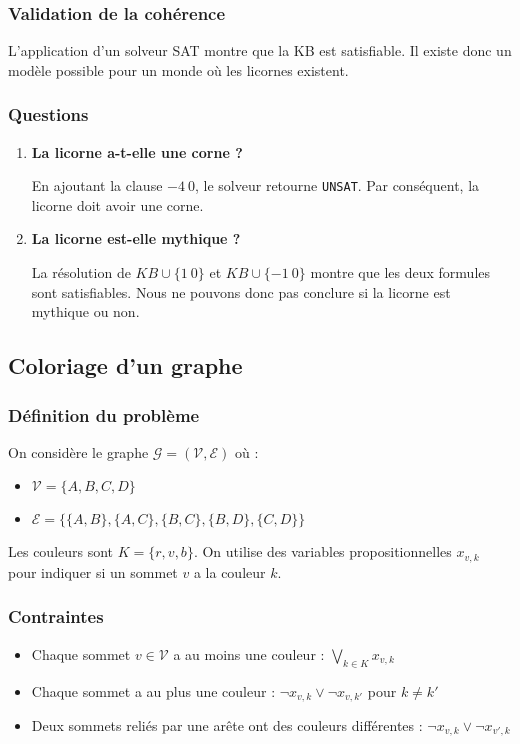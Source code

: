 \documentclass[a4paper,12pt]{article}
\begin{document}
\subsubsection{Validation de la cohérence}
L'application d'un solveur SAT montre que la KB est satisfiable. Il existe donc un modèle possible pour un monde où les licornes existent.

\subsubsection{Questions}
\begin{enumerate}
    \item \textbf{La licorne a-t-elle une corne ?}

    En ajoutant la clause $-4 \ 0$, le solveur retourne \texttt{UNSAT}. Par conséquent, la licorne doit avoir une corne.

    \item \textbf{La licorne est-elle mythique ?}

    La résolution de $KB \cup \{1 \ 0\}$ et $KB \cup \{-1 \ 0\}$ montre que les deux formules sont satisfiables. Nous ne pouvons donc pas conclure si la licorne est mythique ou non.
\end{enumerate}

\subsection{Coloriage d'un graphe}

\subsubsection{Définition du problème}
On considère le graphe $\mathcal{G} = (\mathcal{V}, \mathcal{E})$ où :
\begin{itemize}
    \item $\mathcal{V} = \{A, B, C, D\}$
    \item $\mathcal{E} = \{ \{A, B\}, \{A, C\}, \{B, C\}, \{B, D\}, \{C, D\} \}$
\end{itemize}

Les couleurs sont $K = \{r, v, b\}$. On utilise des variables propositionnelles $x_{v,k}$ pour indiquer si un sommet $v$ a la couleur $k$. 

\subsubsection{Contraintes}
\begin{itemize}
    \item Chaque sommet $v \in \mathcal{V}$ a au moins une couleur : $\bigvee_{k \in K} x_{v,k}$
    \item Chaque sommet a au plus une couleur : $\neg x_{v,k} \lor \neg x_{v,k'}$ pour $k \ne k'$
    \item Deux sommets reliés par une arête ont des couleurs différentes : $\neg x_{v,k} \lor \neg x_{v',k}$
\end{itemize}
\end{document}
